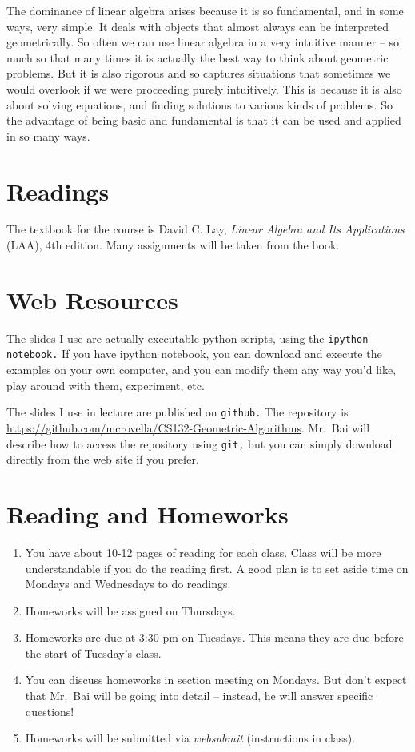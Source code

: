 \documentclass[11pt]{article}
\begin{document}
The dominance of linear algebra arises because it is so fundamental, and
in some ways, very simple. It deals with objects that almost always can
be interpreted geometrically. So often we can use linear algebra in a
very intuitive manner -- so much so that many times it is actually the
best way to think about geometric problems. But it is also rigorous and so
captures situations that sometimes we would overlook if we were
proceeding purely intuitively. This is because it is also about solving
equations, and finding solutions to various kinds of problems. So the
advantage of being basic and fundamental is that it can be used and
applied in so many ways. 

\section*{Readings} 

The textbook for the course is David C. Lay, \emph{Linear Algebra and
  Its Applications} (LAA), 4th edition.    Many assignments will be taken
from the book.

\section*{Web Resources} 

The slides I use are actually executable python scripts, using the
\texttt{ipython notebook.}   If you have ipython notebook, you can
download and execute the examples on your own computer, and you can
modify them any way you'd like, play around with them, experiment, etc.

The slides I use in lecture are published on \texttt{github.}   The
repository is
\url{https://github.com/mcrovella/CS132-Geometric-Algorithms}.  Mr.\ Bai
will describe how to access the repository using \texttt{git,} but you
can simply download directly from the web site if you prefer.
 

\section*{Reading and Homeworks}

\begin{enumerate}
\item  You have about 10-12 pages of reading for each class.   Class will be
more understandable if you do the reading first.   A good plan is to set aside
time on Mondays and Wednesdays to do readings.
\item  Homeworks will be assigned on Thursdays.
\item Homeworks are due at 3:30 pm on Tuesdays.  This means they are due
before the start of Tuesday's class.
\item You can discuss homeworks in section meeting on Mondays.   But don't
expect that Mr.\ Bai will be going into detail -- instead, he will
answer specific questions!
\item Homeworks will be submitted via \emph{websubmit} (instructions in class).
\end{enumerate}
\end{document}
